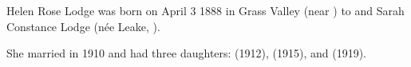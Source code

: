 
Helen Rose Lodge was born on April 3 1888 in Grass Valley (near )\cite{FamilyNotices} 
to 
and Sarah Constance Lodge (n\'{e}e Leake, ).\cite{BMD}

She married  in 1910\cite{HAHmarriage} and had three daughters:
 (1912),
 (1915), and
 (1919).
